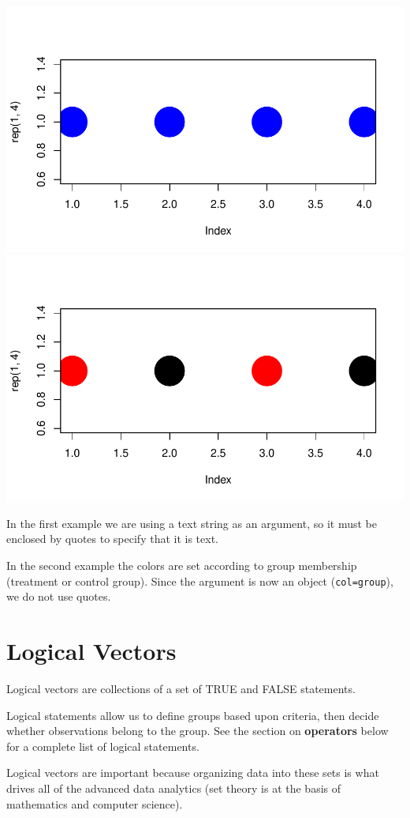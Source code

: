 \documentclass[]{book}
\theoremstyle{definition}
\theoremstyle{definition}
\theoremstyle{definition}
\theoremstyle{remark}
\begin{document}
\begin{center}\includegraphics[width=0.7\linewidth]{DS4PS-I_files/figure-latex/unnamed-chunk-62-1} \includegraphics[width=0.7\linewidth]{DS4PS-I_files/figure-latex/unnamed-chunk-62-2} \end{center}

In the first example we are using a text string as an argument, so it
must be enclosed by quotes to specify that it is text.

In the second example the colors are set according to group membership
(treatment or control group). Since the argument is now an object
(\texttt{col=group}), we do not use quotes.

\hypertarget{logical-vectors}{%
\section{Logical Vectors}\label{logical-vectors}}

Logical vectors are collections of a set of TRUE and FALSE statements.

Logical statements allow us to define groups based upon criteria, then
decide whether observations belong to the group. See the section on
\textbf{operators} below for a complete list of logical statements.

Logical vectors are important because organizing data into these sets is
what drives all of the advanced data analytics (set theory is at the
basis of mathematics and computer science).
\end{document}
